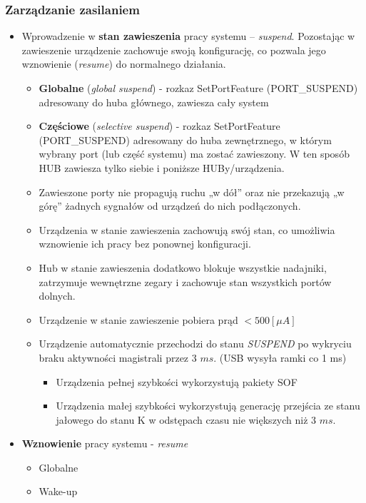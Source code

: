 	\subsubsection{Zarządzanie zasilaniem}
	\begin{itemize}
		\item Wprowadzenie w \textbf{stan zawieszenia} pracy systemu – \emph{suspend}. Pozostając w zawieszenie urządzenie zachowuje swoją konfigurację, co pozwala jego wznowienie (\emph{resume}) do normalnego działania.
		\begin{itemize}
			\item \textbf{Globalne} (\emph{global suspend}) - rozkaz SetPortFeature (PORT\_SUSPEND) adresowany do huba głównego, zawiesza cały system
			\item \textbf{Częściowe} (\emph{selective suspend}) - rozkaz SetPortFeature (PORT\_SUSPEND) adresowany do huba zewnętrznego, w którym wybrany port (lub część systemu) ma zostać zawieszony. W ten sposób HUB zawiesza tylko siebie i poniższe HUBy/urządzenia.
			\item Zawieszone porty nie propagują ruchu „w dół” oraz nie przekazują „w górę” żadnych sygnałów od urządzeń do nich podłączonych.
			\item Urządzenia w stanie zawieszenia zachowują swój stan, co umożliwia wznowienie ich pracy bez ponownej konfiguracji.
			\item Hub w stanie zawieszenia dodatkowo blokuje wszystkie nadajniki, zatrzymuje wewnętrzne zegary i zachowuje stan wszystkich portów dolnych.
			\item Urządzenie w stanie zawieszenie pobiera prąd $< 500 [\mu A]$
			\item Urządzenie automatycznie przechodzi do stanu \emph{SUSPEND} po wykryciu braku aktywności magistrali przez 3 $ms$. (USB wysyła ramki co 1 ms)
			\begin{itemize}
				\item Urządzenia pełnej szybkości wykorzystują pakiety SOF
				\item Urządzenia małej szybkości wykorzystują generację przejścia ze stanu jałowego do stanu K w odstępach czasu nie większych niż 3 $ms$.
			\end{itemize}
		\end{itemize}
		\item \textbf{Wznowienie} pracy systemu - \emph{resume}
		\begin{itemize}
			\item Globalne
			\item Wake-up

\end{itemize}
\end{itemize}
